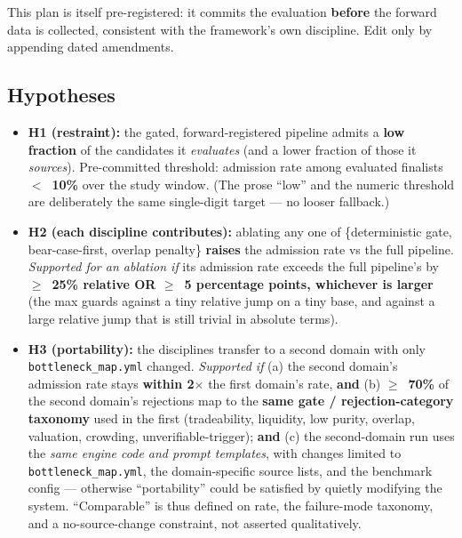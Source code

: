 \documentclass[11pt]{article}
\begin{document}
This plan is itself pre-registered: it commits the evaluation \textbf{before} the forward data is
collected, consistent with the framework's own discipline.
Edit only by appending dated amendments.

\subsection*{Hypotheses}

\begin{itemize}
  \item \textbf{H1 (restraint):} the gated, forward-registered pipeline admits a \textbf{low
    fraction} of the candidates it \emph{evaluates} (and a lower fraction of those it
    \emph{sources}). Pre-committed threshold: admission rate among evaluated finalists
    \textbf{$<$~10\%} over the study window. (The prose ``low'' and the numeric threshold are
    deliberately the same single-digit target --- no looser fallback.)

  \item \textbf{H2 (each discipline contributes):} ablating any one of \{deterministic gate,
    bear-case-first, overlap penalty\} \textbf{raises} the admission rate vs the full pipeline.
    \emph{Supported for an ablation if} its admission rate exceeds the full pipeline's by
    \textbf{$\geq$~25\% relative OR $\geq$~5 percentage points, whichever is larger} (the max
    guards against a tiny relative jump on a tiny base, and against a large relative jump that is
    still trivial in absolute terms).

  \item \textbf{H3 (portability):} the disciplines transfer to a second domain with only
    \texttt{bottleneck\_map.yml} changed. \emph{Supported if} (a) the second domain's admission
    rate stays \textbf{within 2$\times$} the first domain's rate, \textbf{and} (b)
    \textbf{$\geq$~70\%} of the second domain's rejections map to the \textbf{same gate /
    rejection-category taxonomy} used in the first (tradeability, liquidity, low purity, overlap,
    valuation, crowding, unverifiable-trigger); \textbf{and} (c) the second-domain run uses the
    \emph{same engine code and prompt templates}, with changes limited to
    \texttt{bottleneck\_map.yml}, the domain-specific source lists, and the benchmark config ---
    otherwise ``portability'' could be satisfied by quietly modifying the system. ``Comparable'' is
    thus defined on rate, the failure-mode taxonomy, and a no-source-change constraint, not asserted
    qualitatively.


\end{itemize}
\end{document}
